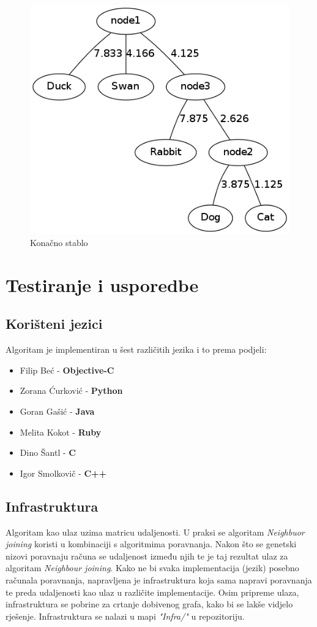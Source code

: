 \documentclass[times, utf8, seminar, numeric]{fer}
\begin{document}
\begin{figure}[htb]
\centering
\includegraphics[scale=0.6]{./img/zadnji.png}
\caption{Konačno stablo}
\end{figure}

\chapter{Testiranje i usporedbe}
\section{Korišteni jezici}
Algoritam je implementiran u šest različitih jezika i to prema podjeli:
\begin{itemize}
	\item Filip Beć - \textbf{Objective-C}
	\item Zorana Ćurković - \textbf{Python}
	\item Goran Gašić - \textbf{Java}
	\item Melita Kokot - \textbf{Ruby}
	\item Dino Šantl - \textbf{C}
	\item Igor Smolkovič - \textbf{C++}
\end{itemize}

\section{Infrastruktura}
Algoritam kao ulaz uzima matricu udaljenosti. U praksi se algoritam \emph{Neighbuor joining} koristi u kombinaciji s algoritmima poravnanja. Nakon što se genetski nizovi poravnaju računa se udaljenost između njih te je taj rezultat ulaz za algoritam \emph{Neighbour joining}. Kako ne bi svaka implementacija (jezik) posebno računala poravnanja, napravljena je infrastruktura koja sama napravi poravnanja te preda udaljenosti kao ulaz u različite implementacije. Osim pripreme ulaza, infrastruktura se pobrine za crtanje dobivenog grafa, kako bi se lakše vidjelo rješenje. Infrastruktura se nalazi u mapi \emph{"Infra/"} u repozitoriju.
\end{document}
